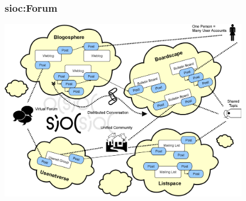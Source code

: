 \documentclass[spanish,notes=hide]{beamer}
\begin{document}
\frame
{
  \frametitle{sioc:Forum}
  \begin{center}
    \includegraphics[width=0.8\textwidth]{images/sioc-discussions.png}
  \end{center}
}
\end{document}
